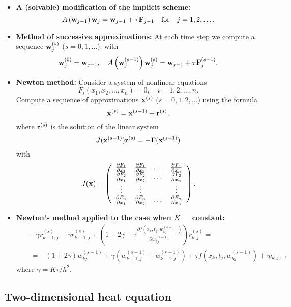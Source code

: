 \documentclass[12pt]{article}
\newcommand\pr{\partial}
\begin{document}
\begin{itemize}
\item \textbf{A (solvable) modification of the implicit scheme:}
\[
A\left({\bf w}_{j-1}\right){\bf w}_{j}={\bf w}_{j-1}+\tau {\bf F}_{j-1} \quad \hbox{for} \quad j=1,2,\dots,
\]


\item \textbf{Method of successive approximations:} 
At each time step
we compute a sequence ${\bf w}_{j}^{(s)}$ ($s=0,1,\dots$).
with
\[
{\bf w}_{j}^{(0)}={\bf w}_{j-1}, \quad
A\left({\bf w}_{j}^{(s-1)}\right){\bf w}_{j}^{(s)}={\bf w}_{j-1}+\tau {\bf F}_{j}^{(s-1)}.
\]



\item \textbf{Newton method:}
Consider a system of nonlinear equations
\[
F_{i}(x_{1}, x_{2},\dots,x_{n})=0, \quad i=1,2,\dots, n.
\]
Compute a sequence
of approximations ${\bf x}^{(s)}$ ($s=0,1,2,\dots$) using the formula
\[
{\bf x}^{(s)}={\bf x}^{(s-1)}+{\bf r}^{(s)},
\]
where ${\bf r}^{(s)}$ is the solution of the linear system
\[
J({\bf x}^{(s-1)}){\bf r}^{(s)}=-{\bf F}({\bf x}^{(s-1)})
\]
with
\[
J({\bf x})=\left(
\begin{array}{cccc}
\frac{\pr F_{1}}{\pr x_{1}} &\frac{\pr F_{1}}{\pr x_{2}} &\dots &\frac{\pr F_{1}}{\pr x_{n}} \\
\frac{\pr F_{2}}{\pr x_{1}} &\frac{\pr F_{2}}{\pr x_{2}} &\dots &\frac{\pr F_{2}}{\pr x_{n}} \\
\vdots &\vdots &   &\vdots \\
\frac{\pr F_{n}}{\pr x_{1}} &\frac{\pr F_{n}}{\pr x_{2}} &\dots &\frac{\pr F_{n}}{\pr x_{n}}
\end{array}\right).
\]


\item \textbf{Newton's method applied to the case when $K=$ constant:}
\begin{eqnarray}
&&-\gamma r_{k-1,j}^{(s)}
-\gamma r_{k+1,j}^{(s)}+\left(1+2\gamma - \tau \frac{\pr f(x_{k},t_{j},w_{kj}^{(s-1)})}{\pr w_{kj}^{(s-1)}}\right)r_{k,j}^{(s)}=  \nonumber \\
&&=-(1+2\gamma)w_{kj}^{(s-1)}+\gamma\left(w_{k+1,j}^{(s-1)}+w_{k-1,j}^{(s-1)}\right)+\tau f\left(x_{k},t_{j},w_{kj}^{(s-1)}\right)+w_{k,j-1}  \nonumber
\end{eqnarray}
where $\gamma=K\tau/h^2$.

\end{itemize}


\subsection*{Two-dimensional heat equation}
\end{document}
